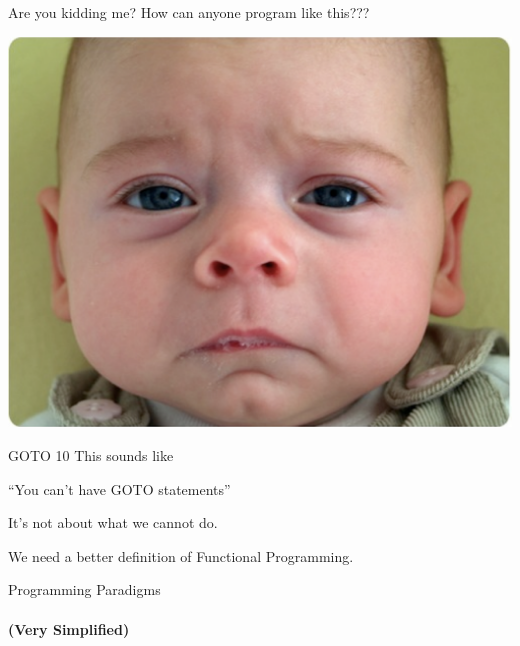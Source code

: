 \documentclass[mathserif]{beamer}
\begin{document}
\begin{frame}{Are you kidding me?}
  How can anyone program like this???
  \begin{center}
    \includegraphics[scale=0.3]{img/sadbaby.png}
  \end{center}
\end{frame}

\begin{frame}{GOTO 10}
    This sounds like
  \begin{exampleblock}{}
    {\Large ``You can't have GOTO statements''}
  \end{exampleblock}
  \vskip5mm
  \hspace*{}
\end{frame}

\begin{frame}{}

  \begin{center}
    {\Huge It's not about what we cannot do.}
  \end{center}

\end{frame}

\begin{frame}{}

  \begin{center}
    {\Huge We need a better definition of Functional Programming.}
  \end{center}

\end{frame}

\begin{frame}{Programming Paradigms}
  \framesubtitle{(Very Simplified)}
\end{frame}
\end{document}
